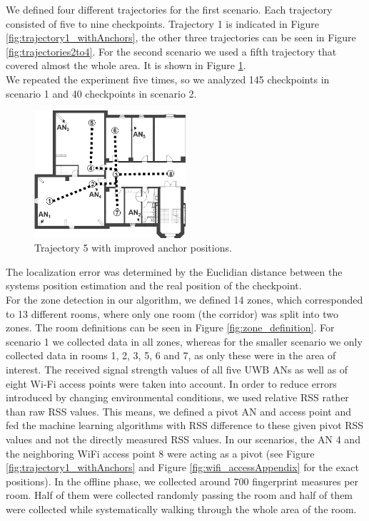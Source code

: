 \noindent\hspace*{5mm}%
We defined four different trajectories for the first scenario. Each trajectory consisted of five to nine checkpoints. Trajectory 1 is indicated in Figure \ref{fig:trajectory1_withAnchors}, the other three trajectories can be seen in Figure \ref{fig:trajectories2to4}.
For the second scenario we used a fifth trajectory that covered almost the whole area. It is shown in Figure \ref{fig:trajectory5_withAnchors}.\\
\noindent\hspace*{5mm}%
We repeated the experiment five times, so we analyzed 145 checkpoints in scenario 1 and 40 checkpoints in scenario 2.\begin{figure}[th]
\centering
\includegraphics[width=0.5\textwidth]{Figures/trajectory5_withAnchors}
\decoRule
\caption[Trajectory 5]{Trajectory 5 with improved anchor positions.}
\label{fig:trajectory5_withAnchors}
\end{figure}
The localization error was determined by the Euclidian distance between the systems position estimation and the real position of the checkpoint.\\
\noindent\hspace*{5mm}%
For the zone detection in our algorithm, we defined 14 zones, which corresponded to 13 different rooms, where only one room (the corridor) was split into two zones. The room definitions can be seen in Figure \ref{fig:zone_definition}. For scenario 1 we collected data in all zones, whereas for the smaller scenario we only collected data in rooms 1, 2, 3, 5, 6 and 7, as only these were in the area of interest. The received signal strength values of all five UWB ANs as well as of eight Wi-Fi access points were taken into account. In order to reduce errors introduced by changing environmental conditions, we used relative RSS rather than raw RSS values. This means, we defined a pivot AN and access point and fed the machine learning algorithms with RSS difference to these given pivot RSS values and not the directly measured RSS values. In our scenarios, the AN 4 and the neighboring WiFi access point 8 were acting as a pivot (see Figure \ref{fig:trajectory1_withAnchors} and Figure \ref{fig:wifi_accessAppendix} for the exact positions). In the offline phase, we collected around 700 fingerprint measures per room. Half of them were collected randomly passing the room and half of them were collected while systematically walking through the whole area of the room.
